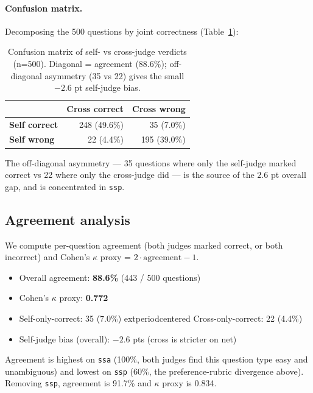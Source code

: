 \paragraph{Confusion matrix.} Decomposing the 500 questions by joint
correctness (Table~\ref{tab:crossjudge-confusion}):

\begin{table}[h]
\centering
\small
\begin{tabular}{lrr}
\toprule
                  & \textbf{Cross correct} & \textbf{Cross wrong} \\
\midrule
\textbf{Self correct} & 248 (49.6\%) & 35 (7.0\%)  \\
\textbf{Self wrong}   & 22  (4.4\%)  & 195 (39.0\%) \\
\bottomrule
\end{tabular}
\caption{Confusion matrix of self- vs cross-judge verdicts (n=500).
Diagonal = agreement (88.6\%); off-diagonal asymmetry (35 vs 22)
gives the small $-2.6$ pt self-judge bias.}
\label{tab:crossjudge-confusion}
\end{table}

The off-diagonal asymmetry --- 35 questions where only the self-judge
marked correct vs 22 where only the cross-judge did --- is the source
of the $2.6$ pt overall gap, and is concentrated in \texttt{ssp}.

\subsection{Agreement analysis}

We compute per-question agreement (both judges marked correct, or both
incorrect) and Cohen's \(\kappa\) proxy = $2 \cdot \text{agreement} - 1$.

\begin{itemize}
\item Overall agreement: \textbf{88.6\%} (443 / 500 questions)
\item Cohen's \(\kappa\) proxy: \textbf{0.772}
\item Self-only-correct: 35 (7.0\%) 	extperiodcentered{}  Cross-only-correct: 22 (4.4\%)
\item Self-judge bias (overall): $-2.6$ pts (cross is stricter on net)
\end{itemize}

Agreement is highest on \texttt{ssa} (100\%, both judges find this
question type easy and unambiguous) and lowest on \texttt{ssp} (60\%,
the preference-rubric divergence above). Removing \texttt{ssp},
agreement is 91.7\% and \(\kappa\) proxy is 0.834.

